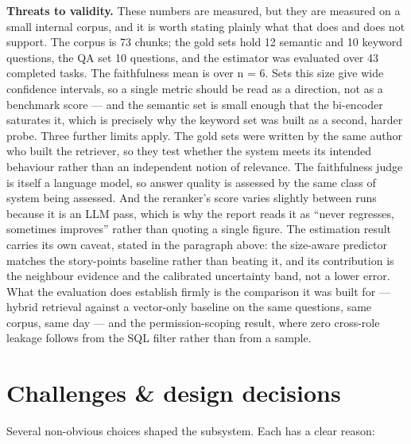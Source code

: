 \textbf{Threats to validity.} These numbers are measured, but they are measured on a small
internal corpus, and it is worth stating plainly what that does and does not support. The corpus
is 73 chunks; the gold sets hold 12 semantic and 10 keyword questions, the QA set 10 questions,
and the estimator was evaluated over 43 completed tasks. The faithfulness mean is over n = 6.
Sets this size give wide confidence intervals, so a single metric should be read as a direction,
not as a benchmark score --- and the semantic set is small enough that the bi-encoder saturates
it, which is precisely why the keyword set was built as a second, harder probe. Three further
limits apply. The gold sets were written by the same author who built the retriever, so they
test whether the system meets its intended behaviour rather than an independent notion of
relevance. The faithfulness judge is itself a language model, so answer quality is assessed by
the same class of system being assessed. And the reranker's score varies slightly between runs
because it is an LLM pass, which is why the report reads it as ``never regresses, sometimes
improves'' rather than quoting a single figure. The estimation result carries its own caveat,
stated in the paragraph above: the size-aware predictor matches the story-points baseline rather
than beating it, and its contribution is the neighbour evidence and the calibrated uncertainty
band, not a lower error. What the evaluation does establish firmly is the comparison it was
built for --- hybrid retrieval against a vector-only baseline on the same questions, same corpus,
same day --- and the permission-scoping result, where zero cross-role leakage follows from the
SQL filter rather than from a sample.

\section{Challenges \& design decisions}

Several non-obvious choices shaped the subsystem. Each has a clear reason:

